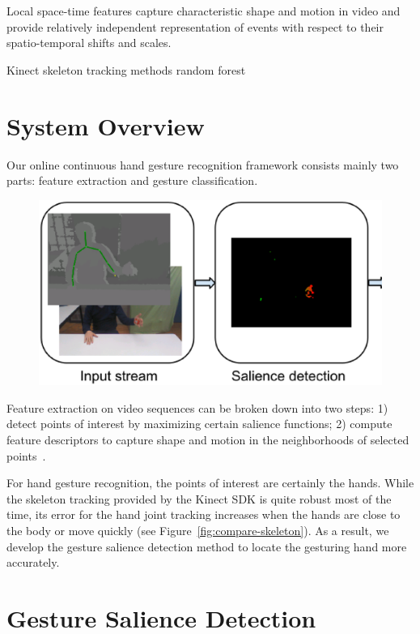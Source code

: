 \documentclass{sigchi}
\begin{document}
Local space-time features capture characteristic shape and motion in video and
provide relatively independent representation of events with respect to their
spatio-temporal shifts and scales. \cite{wang-spatio-2009}


\cite{wang-spatio-2009}

Kinect skeleton tracking methods random forest

\section{System Overview}
Our online continuous hand gesture recognition framework consists mainly two parts: feature
extraction and gesture classification.

\begin{figure}
\centering
\includegraphics[width=1\linewidth, trim=0mm 10mm 0mm 10mm,
clip]{figure/system.ps}
\caption{}
\label{fig:feature}
\end{figure}

Feature extraction on video sequences can be broken down into two steps: 1)
detect points of interest by maximizing certain salience functions; 2) compute
feature descriptors to capture shape and motion in the neighborhoods of selected
points~\cite{wang-spatio-2009}.

For hand gesture recognition, the points of interest are certainly the hands. While the skeleton tracking provided
by the Kinect SDK is quite robust most of the time, its error for the hand joint tracking increases when
the hands are close to the body or move quickly (see Figure~\ref{fig:compare-skeleton}). As a result, we
develop the gesture salience detection method to locate the gesturing hand more accurately.
 
\section{Gesture Salience Detection}
\end{document}
